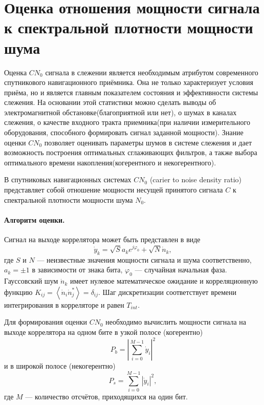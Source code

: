\documentclass{article}
\begin{document}
\section*{Оценка отношения мощности сигнала к спектральной плотности мощности шума}

Оценка $CN_{0}$ сигнала в слежении является необходимым атрибутом современного спутникового навигационного приёмника. Она не только характеризует условия приёма, но и является главным показателем состояния и эффективности системы слежения.  На основании этой статистики можно сделать выводы об электромагнитной обстановке(благоприятной или нет), о шумах в каналах слежения, о качестве входного тракта приемника(при наличии измерительного оборудования, способного формировать сигнал заданной мощности). Знание оценки $CN_{0}$ позволяет оценивать параметры шумов в системе слежения и дает возможность построения оптимальных сглаживающих фильтров, а также выбора оптимального времени накопления(когерентного и некогерентного).

В спутниковых навигационных системах $CN_{0}$ (carier to noise density ratio) представляет собой отношение мощности несущей принятого сигнала $C$ к спектральной плотности мощности шума $N_{0}$.

\paragraph{Алгоритм оценки. \\}

Сигнал на выходе коррелятора может быть представлен в виде
\begin{equation} \label{y}
\dot{y}_{k} = \sqrt{S}a_{k}e^{j\varphi_{0}} + \sqrt{N}\dot{n}_{k},
\end{equation}
где $S$ и $N$ --- неизвестные значения мощности сигнала и шума соответственно, $a_{k} = \pm 1$	в зависимости от знака бита, $\varphi_{0}$ --- случайная начальная фаза. Гауссовский шум $\dot{n}_{k}$ имеет нулевое математическое ожидание и корреляционную функцию $K_{ij}=\left<\dot{n}_{i}\dot{n}_{j}^{*}\right> = \delta_{ij}$. Шаг дискретизации соответствует времени интегрирования в корреляторе и равен $T_{int}$. 

Для формирования оценки $CN_{0}$ необходимо вычислить мощности сигнала на выходе коррелятора на одном бите в узкой полосе (когерентно)
\begin{equation} \label{pb}
P_{b} = \left|\sum_{i=0}^{M-1}\dot{y}_{i}\right|^{2}
\end{equation} 
и в широкой полосе (некогерентно)
\begin{equation} \label{ps}
P_{s} = \sum_{i=0}^{M-1}\left|\dot{y}_{i}\right|^{2},
\end{equation}
где $M$ --- количество отсчётов, приходящихся на один бит.
\end{document}
